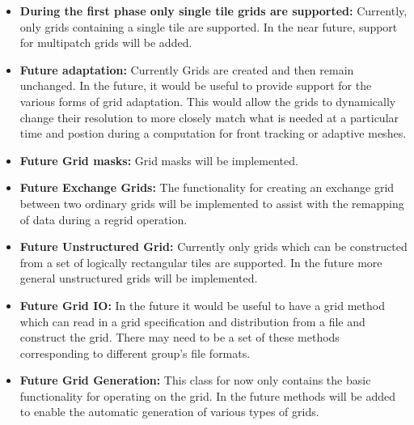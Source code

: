 

\begin{itemize}

\item {\bf During the first phase only single tile grids are supported:}
Currently, only grids containing a single tile are supported. 
In the near future, support for multipatch grids will be added. 

\item {\bf Future adaptation:}  Currently Grids
are created and then remain unchanged. In the future, it would
be useful to provide support for the various forms of grid
adaptation. This would allow the grids to dynamically change
their resolution to more closely match what is needed at a particular
time and postion during a computation for front tracking or adaptive meshes.

\item {\bf Future Grid masks:}  Grid masks will be implemented.

\item {\bf Future Exchange Grids:}  The functionality for creating an 
exchange grid between two ordinary grids will be implemented
to assist with the remapping of data during a regrid operation. 

\item {\bf Future Unstructured Grid:}  Currently only grids which can be constructed from a set of logically rectangular tiles are supported. In the future more general unstructured grids will be implemented.

\item {\bf Future Grid IO:} In the future it would be useful to have a grid method which can read in a grid specification and distribution from a file and construct the grid. There may need to be a set of these methods corresponding to different group's file formats.

\item {\bf Future Grid Generation:} This class for now only contains
the basic functionality for operating on the grid. In the future
methods will be added to enable the automatic generation of various types of
grids. 


\end{itemize}

